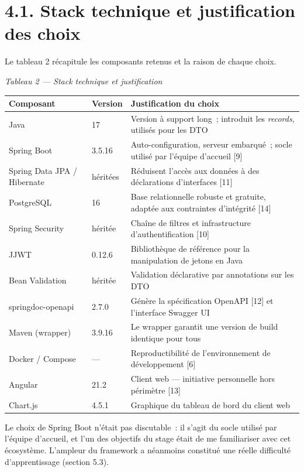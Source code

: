 \documentclass[12pt,a4paper]{report}
\begin{document}
\section*{4.1. Stack technique et justification des choix}
Le tableau 2 récapitule les composants retenus et la raison de chaque choix.
\begin{center}\textit{Tableau 2 — Stack technique et justification}\end{center}
{\small
\begin{tabularx}{\linewidth}{|X|X|X|}
\hline
\textbf{Composant} & \textbf{Version} & \textbf{Justification du choix} \\ \hline
Java & 17 & Version à support long~; introduit les \textit{records}, utilisés pour les DTO \\ \hline
Spring Boot & 3.5.16 & Auto-configuration, serveur embarqué~; socle utilisé par l'équipe d'accueil [9] \\ \hline
Spring Data JPA / Hibernate & héritées & Réduisent l'accès aux données à des déclarations d'interfaces [11] \\ \hline
PostgreSQL & 16 & Base relationnelle robuste et gratuite, adaptée aux contraintes d'intégrité [14] \\ \hline
Spring Security & héritée & Chaîne de filtres et infrastructure d'authentification [10] \\ \hline
JJWT & 0.12.6 & Bibliothèque de référence pour la manipulation de jetons en Java \\ \hline
Bean Validation & héritée & Validation déclarative par annotations sur les DTO \\ \hline
springdoc-openapi & 2.7.0 & Génère la spécification OpenAPI [12] et l'interface Swagger UI \\ \hline
Maven (wrapper) & 3.9.16 & Le wrapper garantit une version de build identique pour tous \\ \hline
Docker / Compose & — & Reproductibilité de l'environnement de développement [6] \\ \hline
Angular & 21.2 & Client web — initiative personnelle hors périmètre [13] \\ \hline
Chart.js & 4.5.1 & Graphique du tableau de bord du client web \\ \hline
\end{tabularx}

}
Le choix de Spring Boot n'était pas discutable~: il s'agit du socle utilisé par l'équipe d'accueil, et l'un des objectifs du stage était de me familiariser avec cet écosystème. L'ampleur du framework a néanmoins constitué une réelle difficulté d'apprentissage (section 5.3).
\end{document}

